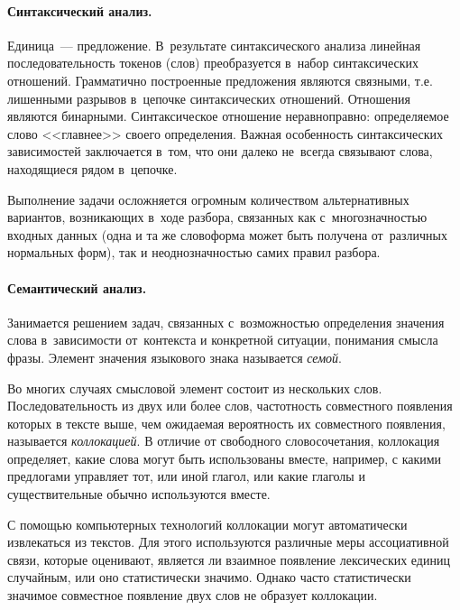 \documentclass[12pt]{article}
\theoremstyle{definition}
\theoremstyle{remark}
\numberwithin{equation}{section}
\begin{document}
\paragraph{Синтаксический анализ.} Единица~--- предложение.
В~результате синтаксического анализа линейная последовательность
токенов (слов) преобразуется в~набор синтаксических отношений. 
Грамматично построенные предложения являются связными, т.е. 
лишенными разрывов в~цепочке синтаксических отношений. Отношения 
являются бинарными. Синтаксическое отношение неравноправно: 
определяемое слово <<главнее>> своего определения. Важная 
особенность синтаксических зависимостей заключается в~том, 
что они далеко не~всегда связывают слова, находящиеся рядом 
в~цепочке.

Выполнение задачи осложняется огромным количеством альтернативных 
вариантов, возникающих в~ходе разбора, связанных как 
с~многозначностью входных данных (одна и та же словоформа может 
быть получена от~различных нормальных форм), так и неоднозначностью 
самих правил разбора.

\paragraph{Семантический анализ.} Занимается решением задач, 
связанных с~возможностью определения значения слова в~зависимости 
от~контекста и конкретной ситуации, понимания смысла фразы. 
Элемент значения языкового знака называется {\sl семой}.

Во многих случаях смысловой элемент состоит из нескольких слов.
Последовательность из двух или более слов, частотность совместного 
появления которых в тексте выше, чем ожидаемая вероятность их 
совместного появления, называется {\sl коллокацией}. В отличие 
от свободного словосочетания, коллокация определяет, какие слова 
могут быть использованы вместе, например, с какими предлогами 
управляет тот, или иной глагол, или какие глаголы и существительные 
обычно используются вместе.

С помощью компьютерных технологий коллокации могут автоматически 
извлекаться из текстов. Для этого используются различные меры 
ассоциативной связи, которые оценивают, является ли взаимное появление
лексических единиц случайным, или оно статистически значимо. Однако
часто статистически значимое совместное появление двух слов не образует
коллокации.
\end{document}
